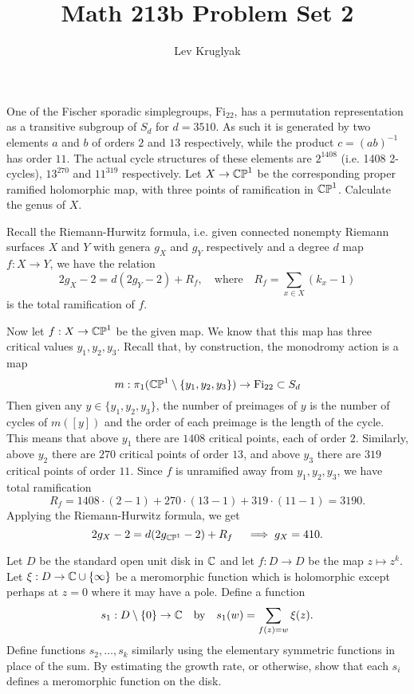 \documentclass{lkx_pset}
\title{Math 213b Problem Set 2}
\author{Lev Kruglyak}
\begin{document}
\maketitle

\begin{problem}{1}
  One of the Fischer sporadic simplegroups, $\mathrm{Fi}_{22}$, has a permutation representation as a transitive subgroup of $S_d$ for $d=3510$. As such it is generated by two elements $a$ and $b$ of orders $2$ and $13$ respectively, while the product $c=(ab)^{-1}$ has order $11$. The actual cycle structures of these elements are $2^{1408}$ (i.e. 1408 2-cycles), $13^{270}$ and $11^{319}$ respectively. Let $X \to \mathbb{CP}^1$ be the corresponding proper ramified holomorphic map, with three points of ramification in $\mathbb{CP}^1$. Calculate the genus of $X$.
\end{problem}

\begin{solution}
  Recall the Riemann-Hurwitz formula, i.e. given connected nonempty Riemann surfaces $X$ and $Y$ with genera $g_X$ and $g_Y$ respectively and a degree $d$ map $f: X \to Y$, we have the relation
  \[
    2g_X - 2 = d(2g_Y - 2) + R_f,\quad\textrm{where}\quad R_f = \sum_{x\in X} (k_x - 1)
  \]
  is the total ramification of $f$. 

  Now let $f : X \to \mathbb{CP}^1$ be the given map. We know that this map has three critical values $y_1, y_2, y_3$. Recall that, by construction, the monodromy action is a map 
  \[
    m : \pi_1(\mathbb{CP}^1\setminus \{y_1, y_2, y_3\}) \to \mathrm{Fi}_{22} \subset S_d
  \]
  Then given any $y\in \{y_1, y_2, y_3\}$, the number of preimages of $y$ is the number of cycles of $m([y])$ and the order of each preimage is the length of the cycle. This means that above $y_1$ there are $1408$ critical points, each of order $2$. Similarly, above $y_2$ there are $270$ critical points of order $13$, and above $y_3$ there are $319$ critical points of order $11$. Since $f$ is unramified away from $y_1, y_2, y_3$, we have total ramification
  \[
  R_f = 1408\cdot (2-1) + 270\cdot (13-1)+319\cdot (11-1) = 3190.\] 
  Applying the Riemann-Hurwitz formula, we get \[2g_X - 2 = d(2g_{\mathbb{CP}^1}-2)+R_f\quad \implies g_X = 410.\]
\end{solution}

\begin{problem}{2}
  Let $D$ be the standard open unit disk in $\mathbb{C}$ and let $f : D \to D$ be the map $z \mapsto z^k$. Let $\xi : D \to \mathbb{C}\cup \{\infty\}$ be a meromorphic function which is holomorphic except perhaps at $z=0$ where it may have a pole. Define a function
  \[
    s_1 : D\setminus \{0\} \to \mathbb{C}\quad\textrm{by}\quad s_1(w) = \sum_{f(z)=w} \xi(z).
  \]
  Define functions $s_2, \ldots, s_k$ similarly using the elementary symmetric functions in place of the sum. By estimating the growth rate, or otherwise, show that each $s_i$ defines a meromorphic function on the disk.
\end{problem}
\end{document}
